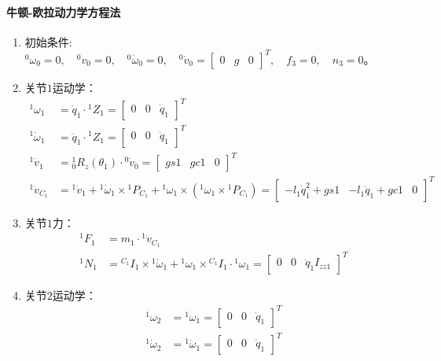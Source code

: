 \documentclass[
12pt, %
a4paper, 
oneside, %
]{scrartcl}
\begin{document}
{\paragraph{牛顿-欧拉动力学方程法}
\begin{enumerate}
\item 初始条件: $ {}^0 \omega_0 = 0, \quad {}^0 v_0 = 0, \quad {}^0 \dot{\omega}_0 = 0, \quad {}^0 \dot{v}_0 = \begin{bmatrix} 0 & g & 0 \end{bmatrix}^T, \quad f_3 = 0, \quad n_3 = 0 $。
\item 关节$ 1 $运动学：
\begin{align*}
{}^1 \omega_1 &= \dot{q}_1 \cdot {}^1 Z_1 = \begin{bmatrix} 0 & 0 & \dot{q}_1 \end{bmatrix}^T \\
{}^1 \dot{\omega}_1 &= \ddot{q}_1 \cdot {}^1 Z_1 = \begin{bmatrix} 0 & 0 & \ddot{q}_1 \end{bmatrix}^T \\
{}^1 \dot{v}_1 &= {}^1_0 R_z(\theta_1) \cdot {}^0 \dot{v}_0 = \begin{bmatrix} gs1 & gc1 & 0 \end{bmatrix}^T \\
{}^1 \dot{v}_{C_1} &= {}^1 \dot{v}_1 + {}^1 \dot{\omega}_1 \times {}^1 P_{C_1} + {}^1 \omega_1 \times ({}^1 \omega_1 \times {}^1 P_{C_1}) = \begin{bmatrix} -l_1 \dot{q}_1^2 + gs1 & -l_1 \ddot{q}_1 + gc1 & 0 \end{bmatrix}^T
\end{align*}
\item 关节$ 1 $力：
\begin{align*}
{}^1 F_1 &= m_1 \cdot {}^1 \dot{v}_{C_1} \\
{}^1 N_1 &= {}^{C_1}I_1 \times {}^1 \dot{\omega}_1 + {}^1 \omega_1 \times {}^{C_1}I_1 \cdot {}^1 \omega_1 = \begin{bmatrix} 0 & 0 & \ddot{q}_1 I_{zz1} \end{bmatrix}^T
\end{align*}
\item 关节$ 2 $运动学：
\begin{align*}
{}^1 \omega_2 &= {}^1 \omega_1 = \begin{bmatrix} 0 & 0 & \dot{q}_1 \end{bmatrix}^T \\
{}^1 \dot{\omega}_2 &= {}^1 \dot{\omega}_1 = \begin{bmatrix} 0 & 0 & \ddot{q}_1 \end{bmatrix}^T \\

\end{align*}
\end{enumerate}}
\end{document}
